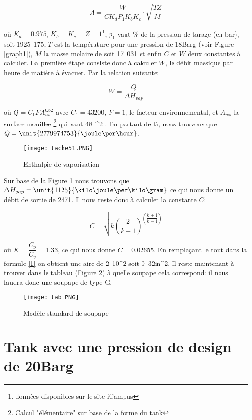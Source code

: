 \begin{equation}
A=\dfrac{W}{CK_dP_1K_bK_c}\cdot \sqrt{\dfrac{TZ}{M}}
\label{1}
\end{equation}

où $K_d=0.975$, $K_b=K_c=Z=1$\footnote{données disponibles sur le site iCampus}, $p_1$ vaut  \% de la pression de tarage (en bar), soit \unit{1925.175}{\kilo \pascal}, $T$ est la température pour une pression de \unit{18}{Barg} (voir Figure \ref{graph1}), $M$ la masse molaire de  soit \unit{17.031}{\gram \per \mole} et enfin $C$ et $W$ deux constantes à calculer. La première étape consiste donc à calculer $W$, le débit massique par heure de matière à évacuer. Par la relation suivante:

$$W=\dfrac{Q}{\Delta H_{vap}}$$

où $Q=C_1FA_{ws}^{0.82}$ avec $C_1=43200$, $F=1$, le facteur environnemental, et $A_ {ws}$ la surface mouillée \footnote{Calcul "élémentaire" sur base de la forme du tank} qui vaut \unit{48\pi}{\meter ^2} . En partant de là, nous trouvons que $Q=\unit{2779974753}{\joule \per \hour}$.

\begin{figure}[ht!]
\centering
\texttt{[image: tache51.PNG]}
\caption{Enthalpie de vaporisation}
\label{graph2}
\end{figure}

Sur base de la Figure \ref{graph2} nous trouvons que $\Delta H_{vap}=\unit{1125}{\kilo \joule \per \kilo \gram}$ ce qui nous donne un débit de sortie de \unit{2471}{\kilo \gram \per \hour}.
Il nous reste donc à calculer la constante $C$:

$$C=\sqrt{k\left( \dfrac{2}{k+1}\right)^{\left( \dfrac{k+1}{k-1}\right)}}$$

où $K=\dfrac{C_p}{C_v}=1.33$, ce qui nous donne $C=0.02655$. En remplaçant le tout dans la formule \ref{1} on obtient une aire de \unit{2.10}{\centi \metre^2} soit \unit{0.32}{in^2}. Il reste maintenant à trouver dans le tableau (Figure \ref{tab}) à quelle soupape cela correspond: il nous faudra donc une soupape de type G.

\begin{figure}[ht!]
\centering
\texttt{[image: tab.PNG]}
\caption{Modèle standard de soupape}
\label{tab}
\end{figure}

\section{Tank avec une pression de design de \unit{20}{Barg}}


